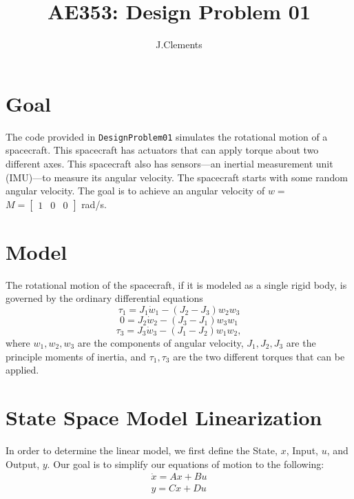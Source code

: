 \documentclass[12pt]{article}
\title{AE353: Design Problem 01}
\author{J.Clements}
\begin{document}
    
\maketitle


\section{Goal}

The code provided in \lstinline!DesignProblem01! simulates the rotational motion of a spacecraft. This spacecraft has actuators that can apply torque about two different axes. This spacecraft also has sensors---an inertial measurement unit (IMU)---to measure its angular velocity. The spacecraft starts with some random angular velocity. The goal is to achieve an angular velocity of $w = $
$M =
    \begin{bmatrix}
    1 & 0 & 0
    \end{bmatrix}$ rad/s.

\section{Model}

The rotational motion of the spacecraft, if it is modeled as a single rigid body, is governed by the ordinary differential equations
\begin{equation}
    \tau_{1} = J_{1}\dot{w}_{1}-(J_{2}-J_{3})w_{2}w_{3}
\end{equation}
\begin{equation}
    0 = J_{2}\dot{w}_{2}-(J_{3}-J_{1})w_{3}w_{1} 
\end{equation}
\begin{equation}
    \tau_{3} = J_{3}\dot{w}_{3}-(J_{1}-J_{2})w_{1}w_{2},
\end{equation}
where $w_{1},w_{2},w_{3}$ are the components of angular velocity, $J_{1},J_{2},J_{3}$ are the principle moments of inertia, and $\tau_{1},\tau_{3}$ are the two different torques that can be applied.

\section{State Space Model Linearization}

In order to determine the linear model, we first define the State, $x$, Input, $u$, and Output, $y$.  Our goal is to simplify our equations of motion to the following:
\begin{align*}
\dot{x} = Ax + Bu \\ y = Cx + Du
\end{align*}
\end{document}
